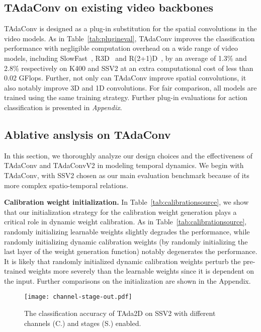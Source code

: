 \documentclass[10pt,journal,compsoc]{IEEEtran}
\begin{document}
\subsection{TAdaConv on existing video backbones}
TAdaConv is designed as a plug-in substitution for the spatial convolutions in the video models. 
As in Table~\ref{tab:plugineval}, TAdaConv improves the classification performance
with negligible computation overhead on a wide range of video models, including SlowFast~\cite{slowfast}, R3D~\cite{retrace} and R(2+1)D~\cite{r21d}, by an average of 1.3\% and 2.8\% respectively on K400 and SSV2 at an extra computational cost of less than 0.02 GFlops.
Further, not only can TAdaConv improve spatial convolutions, it also notably improve 3D and 1D convolutions.
For fair comparison, all models are trained using the same training strategy. 
Further plug-in evaluations for action classification is presented in \textit{Appendix}.
\subsection{Ablative anslysis on TAdaConv}
In this section, we thoroughly analyze our design choices and the effectiveness of TAdaConv and TAdaConvV2 in modeling temporal dynamics. We begin with TAdaConv, with SSV2 chosen as our main evaluation benchmark because of its more complex spatio-temporal relations. 

\textbf{Calibration weight initialization.} In Table~\ref{tab:calibrationsource}, we show that our initialization strategy for the calibration weight generation plays a critical role in dynamic weight calibration.
As in Table~\ref{tab:calibrationsource}, randomly initializing learnable weights slightly degrades the performance, while randomly initializing dynamic calibration weights (by randomly initializing the last layer of the weight generation function) notably degenerates the performance. 
It is likely that randomly initialized dynamic calibration weights perturb the pre-trained weights more severely than the learnable weights since it is dependent on the input.
Further comparisons on the initialization are shown in the Appendix.

\begin{figure}[t]
\centering
\texttt{[image: channel-stage-out.pdf]}
\caption{
The classification accuracy of TAda2D on SSV2 with different channels (C.) and stages (S.) enabled.
}
\vspace{-3mm}
\label{fig:proportions}
\end{figure}
\end{document}
